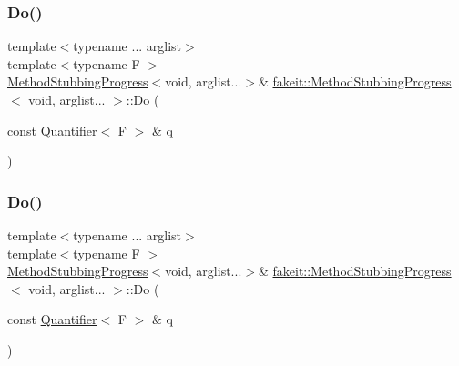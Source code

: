 \mbox{\label{structfakeit_1_1MethodStubbingProgress_3_01void_00_01arglist_8_8_8_01_4_a3091661d404ffecf2733281471d536c4}} 
\subsubsection{\texorpdfstring{Do()}{Do()}\hspace{0.1cm}{\footnotesize\ttfamily [12/27]}}
{\footnotesize\ttfamily template$<$typename ... arglist$>$ \\
template$<$typename F $>$ \\
\mbox{\hyperlink{structfakeit_1_1MethodStubbingProgress}{Method\+Stubbing\+Progress}}$<$void, arglist...$>$\& \mbox{\hyperlink{structfakeit_1_1MethodStubbingProgress}{fakeit\+::\+Method\+Stubbing\+Progress}}$<$ void, arglist... $>$\+::Do (\begin{DoxyParamCaption}\item[{const \mbox{\hyperlink{structfakeit_1_1Quantifier}{Quantifier}}$<$ F $>$ \&}]{q }\end{DoxyParamCaption})\hspace{0.3cm}{\ttfamily [inline]}}

\mbox{\label{structfakeit_1_1MethodStubbingProgress_3_01void_00_01arglist_8_8_8_01_4_a3091661d404ffecf2733281471d536c4}} 
\subsubsection{\texorpdfstring{Do()}{Do()}\hspace{0.1cm}{\footnotesize\ttfamily [13/27]}}
{\footnotesize\ttfamily template$<$typename ... arglist$>$ \\
template$<$typename F $>$ \\
\mbox{\hyperlink{structfakeit_1_1MethodStubbingProgress}{Method\+Stubbing\+Progress}}$<$void, arglist...$>$\& \mbox{\hyperlink{structfakeit_1_1MethodStubbingProgress}{fakeit\+::\+Method\+Stubbing\+Progress}}$<$ void, arglist... $>$\+::Do (\begin{DoxyParamCaption}\item[{const \mbox{\hyperlink{structfakeit_1_1Quantifier}{Quantifier}}$<$ F $>$ \&}]{q }\end{DoxyParamCaption})\hspace{0.3cm}{\ttfamily [inline]}}


